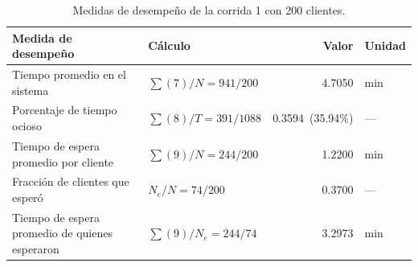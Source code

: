 \begin{table}[H]
\centering
\caption{Medidas de desempe\~no de la corrida 1 con 200 clientes.}
\label{tab:meas200}
\small\setlength{\tabcolsep}{5pt}
\begin{tabular}{@{}llrl@{}}
\toprule
Medida de desempe\~no & C\'alculo & Valor & Unidad \\
\midrule
Tiempo promedio en el sistema & $\sum(7)/N = 941/200$ & 4.7050 & min \\
Porcentaje de tiempo ocioso & $\sum(8)/T = 391/1088$ & 0.3594\ (35.94\%) & --- \\
Tiempo de espera promedio por cliente & $\sum(9)/N = 244/200$ & 1.2200 & min \\
Fracci\'on de clientes que esper\'o & $N_{e}/N = 74/200$ & 0.3700 & --- \\
Tiempo de espera promedio de quienes esperaron & $\sum(9)/N_{e} = 244/74$ & 3.2973 & min \\
\bottomrule
\end{tabular}
\end{table}